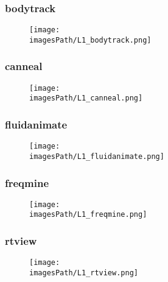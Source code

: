 \documentclass[12pt,a4paper]{article}
\newcommand{\imagesPath}{parsec-3.0/parsec_workspace/graphs}
\begin{document}
			\subsubsection{bodytrack}
				\begin{figure}[H]
					\begin{center}
						\texttt{[image: \\imagesPath/L1\_bodytrack.png]}
					\end{center}	
				\end{figure}			
			
			\subsubsection{canneal}
				\begin{figure}[H]
					\begin{center}
						\texttt{[image: \\imagesPath/L1\_canneal.png]}
					\end{center}
				\end{figure}
							
			\subsubsection{fluidanimate}
				\begin{figure}[H]
					\begin{center}
						\texttt{[image: \\imagesPath/L1\_fluidanimate.png]}
					\end{center}
				\end{figure}
						
			\subsubsection{freqmine}
				\begin{figure}[H]
					\begin{center}
						\texttt{[image: \\imagesPath/L1\_freqmine.png]}
					\end{center}
				\end{figure}			
			
			\subsubsection{rtview}
				\begin{figure}[H]
					\begin{center}
						\texttt{[image: \\imagesPath/L1\_rtview.png]}
					\end{center}
				\end{figure}
						
\end{document}
